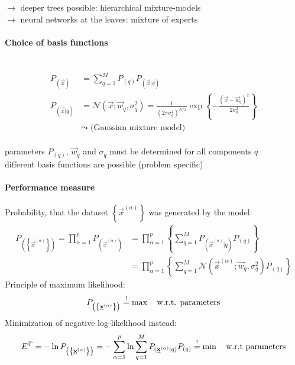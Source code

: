 $\rightarrow$ deeper trees possible: hierarchical mixture-models \\\vspace{0.3cm}
$\rightarrow$ neural networks at the leaves: mixture of experts

\paragraph{Choice of basis functions}\mbox{}\\
\begin{align}
P_{(\vec{x})} &= \sum_{q=1}^{M} P_{(q)} P_{(\vec{x} | q)} \\
P_{(\vec{x} | q)} &= \mathcal{N}\left( \vec{x}; \vec{w}_q, \sigma_q^2 \right) = \frac{1}{(2\pi \sigma_q^2)^{N/2}} \exp \left\{ - \frac{(\vec{x} - \vec{w}_q)^2}{2\sigma_q^2} \right\} \\
&\leadsto \text{ (Gaussian mixture model)}
\end{align}\\\vspace{0.3cm}
parameters $P_{(q)}$, $\vec{w}_q$ and $\sigma_q$ must be determined for all components $q$ \\\vspace{0.3cm}
different basis functions are possible (problem specific)

\paragraph{Performance measure}
Probability, that the dataset $\left\{ \vec{x}^{(\alpha)} \right\}$ was generated by the model:
\begin{align}
P_{\left( \left\{ \vec{x}^{(\alpha)} \right\} \right)} = \prod_{\alpha=1}^{p} P_{(\vec{x}^{(\alpha)})} &= \prod_{\alpha=1}^{p} \left\{ \sum_{q=1}^{M} P_{(\vec{x}^{(\alpha)} | q)} P_{(q)} \right\} \\
&= \prod_{\alpha=1}^{p} \left\{ \sum_{q=1}^{M} \mathcal{N}\left( \vec{x}^{(\alpha)}; \vec{w}_q, \sigma_q^2 \right) P_{(q)} \right\}
\end{align}
Principle of maximum likelihood:
\begin{equation}
P_{\left( \left\{ \underline{\mathbf{x}}^{(\alpha)} \right\} \right)} \stackrel{\mathrm{!}}{=} \max \quad \text{w.r.t. parameters}
\end{equation}
Minimization of negative log-likelihood instead:
\begin{equation}
E^T = - \ln P_{\left( \left\{ \underline{\mathbf{x}}^{(\alpha)} \right\} \right)} = - \sum_{\alpha=1}^{p} \ln \sum_{q=1}^{M} P_{(\underline{\mathbf{x}}^{(\alpha)} | q)} P_{(q)} \stackrel{\mathrm{!}}{=} \min \quad \text{w.r.t parameters}
\end{equation}

